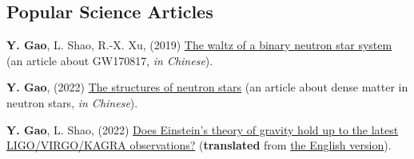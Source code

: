 \documentclass[margin,line]{res}
\begin{document}
\begin{resume}

\ifx\nopubs\undefined

\else
%
\fi

\section{\sc Popular Science Articles}

\begin{etaremune}
  \item {\bf Y. Gao}, L. Shao, R.-X. Xu, (2019) \href{https://gravyong.github.io/files/BNS_Popular.pdf}{The waltz of a binary neutron star system} ({an article about GW170817, \it in Chinese}).
  \item {\bf Y. Gao}, (2022) \href{https://gravyong.github.io/files/NS_Structure_Popular.pdf}{The structures of neutron stars} ({an article about dense matter in neutron stars, \it in Chinese}).
  \item {\bf Y. Gao}, L. Shao, (2022) \href{https://www.ligo.org/science/Publication-O3bTGR/translations/science-summary-chinese-simplified.pdf}{Does Einstein's theory of gravity hold up to the latest \\
  LIGO/VIRGO/KAGRA observations?} ({\bf translated} from \href{https://www.ligo.org/science/Publication-O3bTGR/}{the English version}).
\end{etaremune}




\newpage{}


\end{resume}
\end{document}
